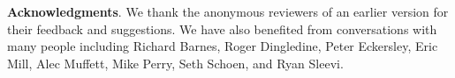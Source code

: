 \documentclass[10pt, conference, compsocconf]{styles/IEEEtran}
\newcommand{\point}[1]{\noindent\textbf{#1}.}
\begin{document}
\point{Acknowledgments}
We thank the anonymous reviewers of an earlier version for their
feedback and suggestions.  We have also benefited from conversations
with many people including Richard Barnes, Roger Dingledine, Peter
Eckersley, Eric Mill, Alec Muffett, Mike Perry, Seth Schoen, and Ryan
Sleevi.



 
\newcommand{\BIBdecl}{\setlength{\itemsep}{0\baselineskip plus 0.1\baselineskip minus 0.1\baselineskip}}
\balance
{\footnotesize 


}

 
%
\end{document}
